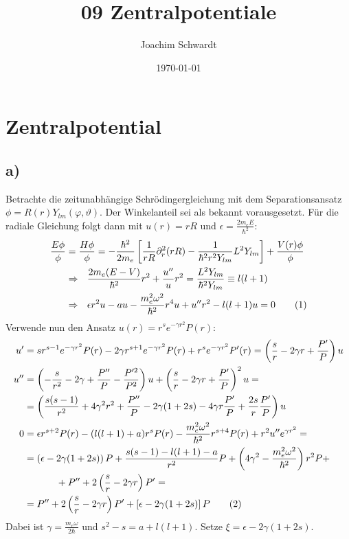 \documentclass[a4paper,12pt]{article}
\newcommand\numberthis{\addtocounter{equation}{1}\tag{\theequation}}
\newcommand{\kla}{}
\newcommand{\klam}{}
\begin{document}
\title{09 Zentralpotentiale}
\author{Joachim Schwardt}
\date{\today}
\maketitle

\section{Zentralpotential}
\subsection*{a) }
Betrachte die zeitunabhängige Schrödingergleichung mit dem Separationsansatz $\phi = R(r)Y_{lm}(\varphi,\vartheta)$. Der Winkelanteil sei als bekannt vorausgesetzt. Für die radiale Gleichung folgt dann mit $u(r)=rR$ und $\epsilon = \frac{2m_eE}{\hbar^2}$:
\begin{align*}
\frac{E\phi}{\phi}&=\frac{H\phi}{\phi}=-\frac{\hbar^2}{2m_e}\klam\left[ {\frac{1}{rR}\partial_r^2(rR)-\frac{1}{\hbar^2r^2Y_{lm}}L^2Y_{lm}} \right]+\frac{V(r)\phi}{\phi}\\
&\Rightarrow\ \ \frac{2m_e(E-V)}{\hbar^2}r^2+\frac{u''}{u}r^2=\frac{L^2Y_{lm}}{\hbar^2Y_{lm}}\equiv l(l+1)\\
&\Rightarrow\ \ \epsilon r^2u-au-\frac{m_e^2\omega^2}{\hbar^2}r^4u+u''r^2-l(l+1)u=0 \numberthis\label{Radialgleichung mit u=rR}
\end{align*}
Verwende nun den Ansatz $u(r)=r^se^{-\gamma r^2}P(r)$:
\begin{align*}
u'&=sr^{s-1}e^{-\gamma r^2}P(r)-2\gamma r^{s+1}e^{-\gamma r^2}P(r)+r^se^{-\gamma r^2}P'(r)=\kla\left( {\frac{s}{r}-2\gamma r +\frac{P'}{P}} \right)u \\
u''&=\kla\left( {-\frac{s}{r^2}-2\gamma +\frac{P''}{P}-\frac{P'^2}{P^2}} \right)u+ \kla\left( {\frac{s}{r}-2\gamma r +\frac{P'}{P}} \right)^2u = \\
&=\kla\left( {\frac{s(s-1)}{r^2}+4\gamma^2r^2+\frac{P''}{P}-2\gamma(1+2s)-4\gamma r\frac{P'}{P}+\frac{2s}{r}\frac{P'}{P}} \right)u \\
0&=\epsilon r^{s+2}P(r)-(l(l+1)+a)r^sP(r)-\frac{m_e^2\omega^2}{\hbar^2}r^{s+4}P(r)+r^2u''e^{\gamma r^2} = \\
&=\kla\left( {\epsilon -2\gamma(1+2s)} \right)P + \frac{s(s-1)-l(l+1)-a}{r^2}P+\kla\left( {4\gamma^2-\frac{m_e^2\omega^2}{\hbar^2}} \right)r^2P+\\
&\ \ \ \ \ \ \ \ \ \ +P''+2\kla\left( {\frac{s}{r}-2\gamma r} \right)P' = \\
&=P''+2\kla\left( {\frac{s}{r}-2\gamma r} \right)P'+\klam\left[ {\epsilon-2\gamma (1+2s)} \right]P \numberthis\label{Radialgleichung mit P}
\end{align*}
Dabei ist $\gamma = \frac{m_e\omega}{2\hbar}$ und $s^2-s=a+l(l+1)$. Setze $\xi=\epsilon-2\gamma(1+2s)$. 
\end{document}
